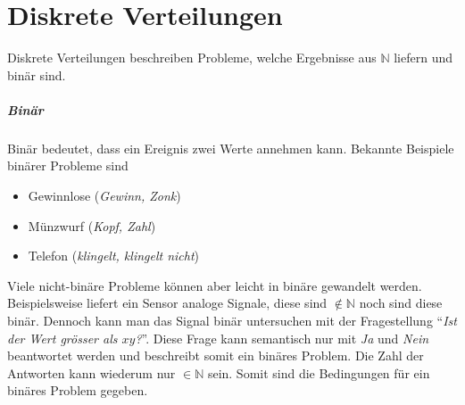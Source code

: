



\chapter{Diskrete Verteilungen}
Diskrete Verteilungen beschreiben Probleme, welche
Ergebnisse aus $\mathbb{N}$ liefern und binär sind.

\paragraph{Binär}
Binär bedeutet, dass ein Ereignis zwei Werte annehmen kann. Bekannte
Beispiele binärer Probleme sind
\begin{itemize}
	\item Gewinnlose \hfill{} (\emph{Gewinn, Zonk})
	\item Münzwurf \hfill{} (\emph{Kopf, Zahl})
	\item Telefon \hfill{} (\emph{klingelt, klingelt nicht})
\end{itemize}
Viele nicht-binäre Probleme können aber leicht in binäre gewandelt
werden. Beispielsweise liefert ein Sensor analoge Signale, diese sind
$\notin \mathbb{N}$ noch sind diese binär. 
Dennoch kann man das Signal binär
untersuchen mit der Fragestellung 
"`\emph{Ist der Wert grösser als $xy$?}"'.
Diese Frage kann semantisch nur mit \emph{Ja} und \emph{Nein} beantwortet
werden und beschreibt somit ein binäres Problem. Die Zahl der Antworten
kann wiederum nur $\in \mathbb{N}$ sein. Somit sind die Bedingungen 
für ein binäres Problem gegeben.

\newpage
